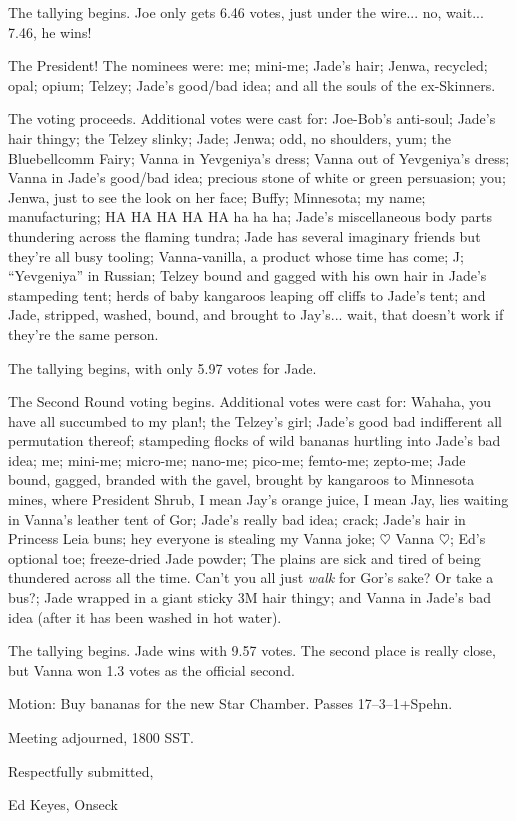 \documentclass[12pt]{article}
\begin{document}
The tallying begins.  Joe only gets 6.46 votes, just under the wire...
no, wait... 7.46, he wins!

The President!  The nominees were: me; mini-me; Jade's hair; Jenwa,
recycled; opal; opium; Telzey; Jade's good/bad idea; and all the souls
of the ex-Skinners.

The voting proceeds.  Additional votes were cast for: Joe-Bob's anti-soul;
Jade's hair thingy; the Telzey slinky; Jade; Jenwa; odd, no shoulders,
yum; the Bluebellcomm Fairy; Vanna in Yevgeniya's dress; Vanna out of
Yevgeniya's dress; Vanna in Jade's good/bad idea; precious stone of white
or green persuasion; you; Jenwa, just to see the look on her face; Buffy;
Minnesota; my name; manufacturing; HA HA HA HA HA ha ha ha; Jade's
miscellaneous body parts thundering across the flaming tundra; Jade has
several imaginary friends but they're all busy tooling; Vanna-vanilla,
a product whose time has come; J; ``Yevgeniya'' in Russian; Telzey bound
and gagged with his own hair in Jade's stampeding tent; herds of baby
kangaroos leaping off cliffs to Jade's tent; and Jade, stripped, washed,
bound, and brought to Jay's... wait, that doesn't work if they're the
same person.

The tallying begins, with only 5.97 votes for Jade.

The Second Round voting begins.  Additional votes were cast for:
Wahaha, you have all succumbed to my plan!; the Telzey's girl; Jade's
good bad indifferent all permutation thereof; stampeding flocks of
wild bananas hurtling into Jade's bad idea; me; mini-me; micro-me;
nano-me; pico-me; femto-me; zepto-me; Jade bound, gagged, branded
with the gavel, brought by kangaroos to Minnesota mines, where
President Shrub, I mean Jay's orange juice, I mean Jay, lies waiting
in Vanna's leather tent of Gor; Jade's really bad idea; crack; Jade's
hair in Princess Leia buns; hey everyone is stealing my Vanna joke;
$\heartsuit$ Vanna $\heartsuit$; Ed's optional toe; freeze-dried Jade
powder; The plains are sick and tired of being thundered across all
the time.  Can't you all just {\em walk} for Gor's sake?  Or take a
bus?; Jade wrapped in a giant sticky 3M hair thingy; and Vanna in Jade's
bad idea (after it has been washed in hot water).

The tallying begins.  Jade wins with 9.57 votes.  The second place is
really close, but Vanna won 1.3 votes as the official second.

Motion: Buy bananas for the new Star Chamber.  Passes 17--3--1+Spehn.

\vspace{12pt}

\noindent
Meeting adjourned, 1800 SST.

\vspace{18pt}

\centerline{Respectfully submitted,}
\centerline{Ed Keyes, Onseck}
\end{document}
